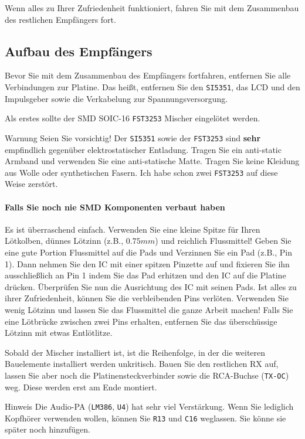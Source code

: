 \documentclass[10pt, a4paper,twoside]{scrartcl}
\newenvironment{remark}{\begin{bclogo}[couleur=blue!30,arrondi=.1,logo=\bcinfo,ombre=true]{Hinweis}}{\end{bclogo}}
\newenvironment{warning}{\begin{bclogo}[couleur=red!30,arrondi=.1,logo=\bcattention,ombre=true]{Warnung}}{\end{bclogo}}
\begin{document}
Wenn alles zu Ihrer Zufriedenheit funktioniert, fahren Sie mit dem Zusammenbau des restlichen Empfängers fort.


\subsection{Aufbau des Empfängers}
Bevor Sie mit dem Zusammenbau des Empfängers fortfahren, entfernen Sie alle Verbindungen zur Platine. Das heißt, entfernen Sie den \texttt{SI5351}, das LCD und den Impulsgeber sowie die Verkabelung zur Spannungsversorgung.

Als erstes sollte der SMD SOIC-16 \texttt{FST3253} Mischer eingelötet werden. 

\begin{warning}
 Seien Sie vorsichtig! Der \texttt{SI5351} sowie der \texttt{FST3253} sind \textbf{sehr} empfindlich gegenüber elektrostatischer Entladung. Tragen Sie ein anti-static Armband und verwenden Sie eine anti-statische Matte. Tragen Sie keine Kleidung aus Wolle oder synthetischen Fasern. Ich habe schon zwei \texttt{FST3253} auf diese Weise zerstört. 
\end{warning}

\paragraph{Falls Sie noch nie SMD Komponenten verbaut haben}
 Es ist überraschend einfach. Verwenden Sie eine kleine Spitze für Ihren Lötkolben, dünnes Lötzinn (z.B., $0.75mm$) und reichlich Flussmittel! Geben Sie eine gute Portion Flussmittel auf die Pads und Verzinnen Sie ein Pad (z.B., Pin 1). Dann nehmen Sie den IC mit einer spitzen Pinzette auf und fixieren Sie ihn ausschließlich an Pin 1 indem Sie das Pad erhitzen und den IC auf die Platine drücken. Überprüfen Sie nun die Ausrichtung des IC mit seinen Pads. Ist alles zu ihrer Zufriedenheit, können Sie die verbleibenden Pins verlöten. Verwenden Sie wenig Lötzinn und lassen Sie das Flussmittel die ganze Arbeit machen! Falls Sie eine Lötbrücke zwischen zwei Pins erhalten, entfernen Sie das überschüssige Lötzinn mit etwas Entlötlitze.

Sobald der Mischer installiert ist, ist die Reihenfolge, in der die  weiteren Bauelemente installiert werden unkritisch. Bauen Sie den restlichen RX auf, lassen Sie aber noch die Platinensteckverbinder sowie die RCA-Buchse (\texttt{TX-OC}) weg. Diese werden erst am Ende montiert.

\begin{remark}
Die Audio-PA (\texttt{LM386}, \texttt{U4}) hat sehr viel Verstärkung. Wenn Sie lediglich Kopfhörer verwenden wollen, können Sie \texttt{R13} und \texttt{C16} weglassen. Sie könne sie später noch hinzufügen.
\end{remark}
\end{document}
